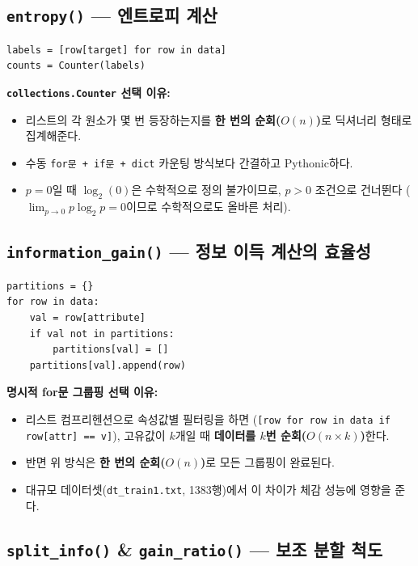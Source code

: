 \documentclass[12pt, a4paper]{article}
\begin{document}
\subsection{\texttt{entropy()} --- 엔트로피 계산}

\begin{verbatim}
labels = [row[target] for row in data]
counts = Counter(labels)
\end{verbatim}

\noindent\textbf{\texttt{collections.Counter} 선택 이유:}
\begin{itemize}
    \item 리스트의 각 원소가 몇 번 등장하는지를 \textbf{한 번의 순회($O(n)$)}로 딕셔너리 형태로 집계해준다.
    \item 수동 \texttt{for문 + if문 + dict} 카운팅 방식보다 간결하고 Pythonic하다.
    \item $p = 0$일 때 $\log_2(0)$은 수학적으로 정의 불가이므로, $p > 0$ 조건으로 건너뛴다 ($\lim_{p \to 0} p \log_2 p = 0$이므로 수학적으로도 올바른 처리).
\end{itemize}


\subsection{\texttt{information\_gain()} --- 정보 이득 계산의 효율성}

\begin{verbatim}
partitions = {}
for row in data:
    val = row[attribute]
    if val not in partitions:
        partitions[val] = []
    partitions[val].append(row)
\end{verbatim}

\noindent\textbf{명시적 for문 그룹핑 선택 이유:}
\begin{itemize}
    \item 리스트 컴프리헨션으로 속성값별 필터링을 하면 (\texttt{[row for row in data if row[attr] == v]}), 고유값이 $k$개일 때 \textbf{데이터를 $k$번 순회($O(n \times k)$)}한다.
    \item 반면 위 방식은 \textbf{한 번의 순회($O(n)$)}로 모든 그룹핑이 완료된다.
    \item 대규모 데이터셋(\texttt{dt\_train1.txt}, 1383행)에서 이 차이가 체감 성능에 영향을 준다.
\end{itemize}


\subsection{\texttt{split\_info()} \& \texttt{gain\_ratio()} --- 보조 분할 척도}
\end{document}
